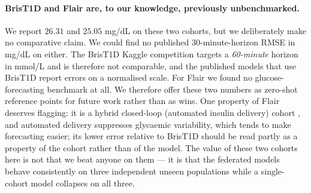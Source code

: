 \documentclass[10pt,letterpaper]{article}
\begin{document}
\paragraph{BrisT1D and Flair are, to our knowledge, previously unbenchmarked.} We
report $26.31$ and $25.05$ mg/dL on these two cohorts, but we deliberately make no
comparative claim. We could find no published 30-minute-horizon RMSE in mg/dL on
either. The BrisT1D Kaggle competition \cite{kaggle2024brist1d} targets a
\emph{60-minute} horizon in mmol/L and is therefore not comparable, and the
published models that use BrisT1D report errors on a normalised scale. For Flair
we found no glucose-forecasting benchmark at all. We therefore offer these two
numbers as zero-shot reference points for future work rather than as wins. One
property of Flair deserves flagging: it is a hybrid closed-loop (automated
insulin delivery) cohort \cite{bergenstal2021flair}, and automated delivery
suppresses glycaemic variability, which tends to make forecasting easier; its
lower error relative to BrisT1D should be read partly as a property of the cohort
rather than of the model. The value of these two cohorts here is not that we beat
anyone on them --- it is that the federated models behave consistently on three
independent unseen populations while a single-cohort model collapses on all three.
\end{document}
